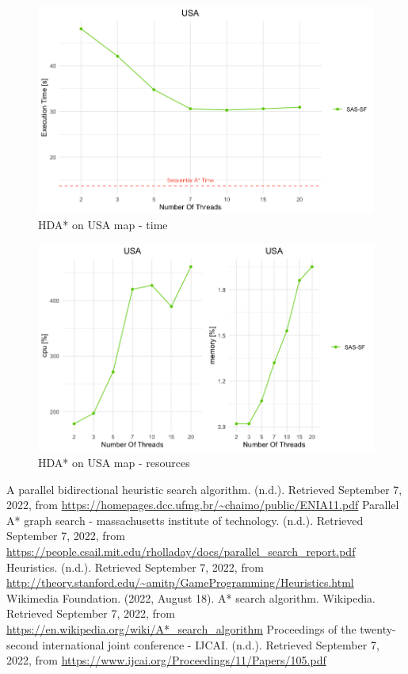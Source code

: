 \documentclass[twocolumn, switch]{article} %
\begin{document}
\begin{figure}[ht!]
  \centering
  \includegraphics[width=1\linewidth]{hda/usatime.png}
  \caption{HDA* on USA map - time}
  \label{cmpusatime}
\end{figure}
\begin{figure}[ht!]
  \centering
  \includegraphics[width=1\linewidth]{hda/usacpumem.png}
  \caption{HDA* on USA map - resources}
  \label{cmpusacpumem}
\end{figure}
\newpage
\begin{thebibliography}{9}
   A parallel bidirectional heuristic search algorithm. (n.d.). Retrieved September 7, 2022, 
  from \url{https://homepages.dcc.ufmg.br/~chaimo/public/ENIA11.pdf}
   Parallel A* graph search - massachusetts institute of technology. (n.d.). Retrieved September 7, 2022, from 
  \url{https://people.csail.mit.edu/rholladay/docs/parallel_search_report.pdf}
  Heuristics. (n.d.). Retrieved September 7, 2022, from 
  \url{http://theory.stanford.edu/~amitp/GameProgramming/Heuristics.html}
  Wikimedia Foundation. (2022, August 18). A* search algorithm. Wikipedia. Retrieved September 7, 2022, 
  from \url{https://en.wikipedia.org/wiki/A*_search_algorithm}
  Proceedings of the twenty-second international joint conference - IJCAI. (n.d.). Retrieved September 7, 2022, 
  from \url{https://www.ijcai.org/Proceedings/11/Papers/105.pdf}
\end{thebibliography}
\end{document}
